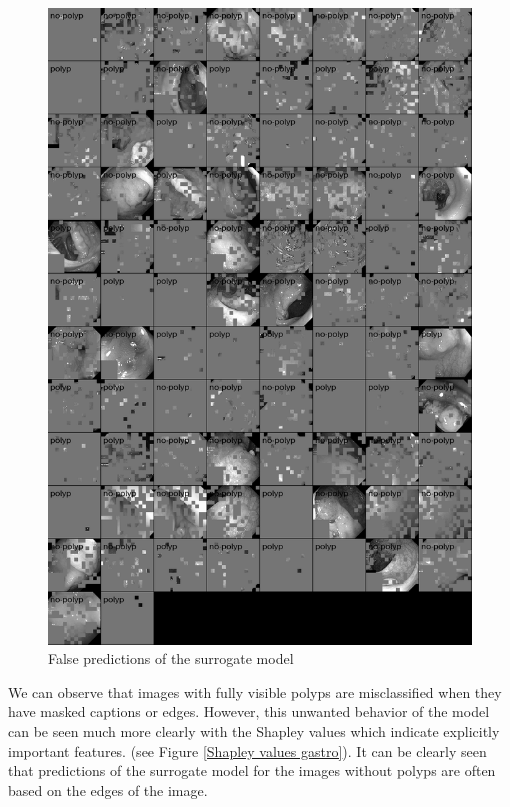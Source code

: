 \documentclass[magisterska,en]{pracamgr}
\begin{document}
\begin{figure}[H]
\centering
\includegraphics[scale=0.4]{./images/gastro_false_surrogate.png}
\caption{False predictions of the surrogate model}
\label{gastro_vit_masked}
\end{figure}


We can observe that images with fully visible polyps are misclassified when they have masked captions or edges.
However, this unwanted behavior of the model can be seen much more clearly with the Shapley values which indicate explicitly important features.
(see Figure \ref{Shapley values gastro}). It can be clearly seen that predictions of the surrogate model for the images without polyps are often based on the edges of the image.
\end{document}
